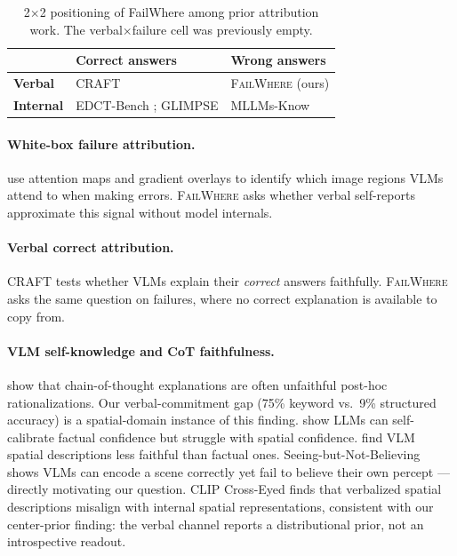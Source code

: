 \documentclass[twoside,11pt]{article}
\begin{document}
\begin{table}[t]
\centering
\small
\begin{tabular}{lll}
\toprule
 & Correct answers & \textbf{Wrong answers} \\
\midrule
\textbf{Verbal} & CRAFT \citep{parcalabescu-frank-2023-craft} & \textsc{FailWhere} (ours) \\
\textbf{Internal} & EDCT-Bench \citep{zang-2026-edct}; GLIMPSE & MLLMs-Know \citep{zhang-2025-mllms} \\
\bottomrule
\end{tabular}
\caption{2$\times$2 positioning of FailWhere among prior attribution work.
The verbal$\times$failure cell was previously empty.}
\label{tab:2x2}
\end{table}

\paragraph{White-box failure attribution.}
\citet{zhang-2025-mllms} use attention maps and gradient overlays to identify
which image regions VLMs attend to when making errors.
\textsc{FailWhere} asks whether verbal self-reports approximate this signal without
model internals.

\paragraph{Verbal correct attribution.}
CRAFT \citep{parcalabescu-frank-2023-craft} tests whether VLMs explain their
\emph{correct} answers faithfully.
\textsc{FailWhere} asks the same question on failures, where no correct explanation
is available to copy from.

\paragraph{VLM self-knowledge and CoT faithfulness.}
\citet{madsen-etal-2024-faithfulness} show that chain-of-thought explanations are
often unfaithful post-hoc rationalizations.
Our verbal-commitment gap (75\% keyword vs.\ 9\% structured accuracy) is a
spatial-domain instance of this finding.
\citet{kadavath-2022-knowwhat} show LLMs can self-calibrate factual confidence but
struggle with spatial confidence.
\citet{shen-2023-visual-cot} find VLM spatial descriptions less faithful than
factual ones.
Seeing-but-Not-Believing \citep{seeing-2025} shows VLMs can encode a scene
correctly yet fail to believe their own percept — directly motivating our question.
CLIP Cross-Eyed \citep{clipcross-2026} finds that verbalized spatial descriptions
misalign with internal spatial representations, consistent with our center-prior
finding: the verbal channel reports a distributional prior, not an introspective readout.
\end{document}
